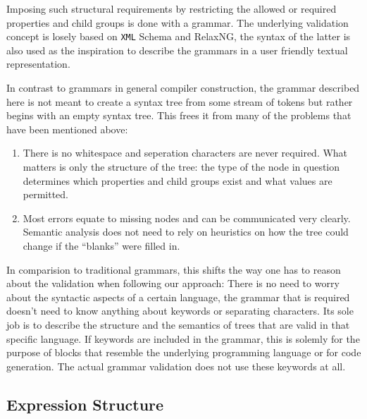 \documentclass[sigconf,natbib=false]{acmart}
\newcommand{\enquote}[1]{``#1''}
\newcommand\todo[1]{{\bfseries ToDo: #1}}
\begin{document}
Imposing such structural requirements by restricting the allowed or required properties and child groups is done with a grammar. The underlying validation concept is losely based on \texttt{XML} Schema and RelaxNG, the syntax of the latter is also used as the inspiration to describe the grammars in a user friendly textual representation.

In contrast to grammars in general compiler construction, the grammar described here is not meant to create a syntax tree from some stream of tokens but rather begins with an empty syntax tree. This frees it from many of the problems that have been mentioned above:

\begin{enumerate}
\item There is no whitespace and seperation characters are never required. What matters is only the structure of the tree: the type of the node in question determines which properties and child groups exist and what values are permitted.
\item Most errors equate to missing nodes and can be communicated very clearly. Semantic analysis does not need to rely on heuristics on how the tree could change if the \enquote{blanks} were filled in.
\end{enumerate}

In comparision to traditional grammars, this shifts the way one has to reason about the validation when following our approach: There is no need to worry about the syntactic aspects of a certain language, the grammar that is required doesn’t need to know anything about keywords or separating characters. Its sole job is to describe the structure and the semantics of trees that are valid in that specific language. If keywords are included in the grammar, this is solemly for the purpose of blocks that resemble the underlying programming language or for code generation. The actual grammar validation does not use these keywords at all.

\subsection{Expression Structure}
\end{document}
